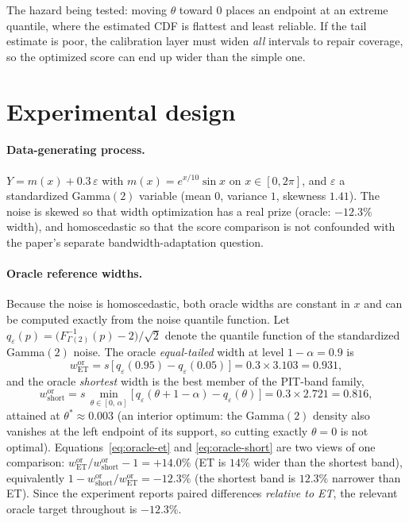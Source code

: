 \documentclass[11pt]{article}
\begin{document}
The hazard being tested: moving $\theta$ toward $0$ places an endpoint at an
extreme quantile, where the estimated CDF is flattest and least reliable. If
the tail estimate is poor, the calibration layer must widen \emph{all}
intervals to repair coverage, so the optimized score can end up wider than
the simple one.

\section{Experimental design}

\paragraph{Data-generating process.}
$Y = m(x) + 0.3\,\varepsilon$ with $m(x) = e^{x/10}\sin x$ on
$x \in [0, 2\pi]$, and $\varepsilon$ a standardized Gamma$(2)$ variable
(mean $0$, variance $1$, skewness $1.41$). The noise is skewed so that width
optimization has a real prize (oracle: $-12.3\%$ width), and homoscedastic so
that the score comparison is not confounded with the paper's separate
bandwidth-adaptation question.

\paragraph{Oracle reference widths.}
Because the noise is homoscedastic, both oracle widths are constant in $x$
and can be computed exactly from the noise quantile function. Let
$q_{\varepsilon}(p) = \bigl(F^{-1}_{\Gamma(2)}(p) - 2\bigr)/\sqrt{2}$ denote
the quantile function of the standardized Gamma$(2)$ noise. The oracle
\emph{equal-tailed} width at level $1-\alpha = 0.9$ is
\begin{equation}
w^{\mathrm{or}}_{\mathrm{ET}}
  = s \,\bigl[\, q_{\varepsilon}(0.95) - q_{\varepsilon}(0.05) \,\bigr]
  = 0.3 \times 3.103 = 0.931,
\label{eq:oracle-et}
\end{equation}
and the oracle \emph{shortest} width is the best member of the PIT-band
family,
\begin{equation}
w^{\mathrm{or}}_{\mathrm{short}}
  = s \,\min_{\theta \in [0,\,\alpha]}
    \bigl[\, q_{\varepsilon}(\theta + 1 - \alpha) - q_{\varepsilon}(\theta)
    \,\bigr]
  = 0.3 \times 2.721 = 0.816,
\label{eq:oracle-short}
\end{equation}
attained at $\theta^{*} \approx 0.003$ (an interior optimum: the Gamma$(2)$
density also vanishes at the left endpoint of its support, so cutting
exactly $\theta = 0$ is not optimal). Equations~\eqref{eq:oracle-et} and
\eqref{eq:oracle-short} are two views of one comparison:
$w^{\mathrm{or}}_{\mathrm{ET}} / w^{\mathrm{or}}_{\mathrm{short}} - 1 =
+14.0\%$ (ET is $14\%$ wider than the shortest band), equivalently
$1 - w^{\mathrm{or}}_{\mathrm{short}} / w^{\mathrm{or}}_{\mathrm{ET}} =
-12.3\%$ (the shortest band is $12.3\%$ narrower than ET). Since the
experiment reports paired differences \emph{relative to ET}, the relevant
oracle target throughout is $-12.3\%$.
\end{document}
